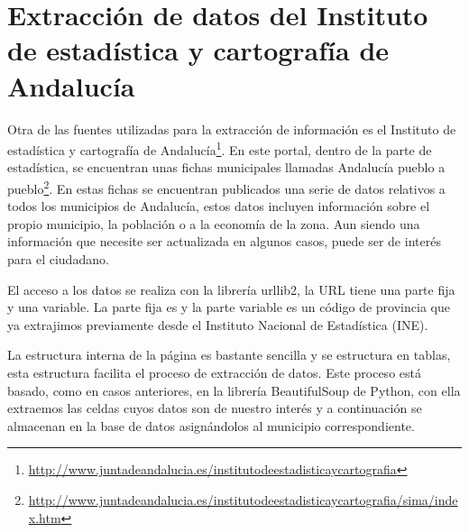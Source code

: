 \section{Extracción de datos del Instituto de estadística y cartografía  de Andalucía}

Otra de las fuentes utilizadas para la extracción de información es el Instituto de estadística y cartografía  de Andalucía\footnote{\url{http://www.juntadeandalucia.es/institutodeestadisticaycartografia}}. En este portal, dentro de la parte de estadística, se encuentran unas fichas municipales llamadas Andalucía pueblo a pueblo\footnote{\url{http://www.juntadeandalucia.es/institutodeestadisticaycartografia/sima/index.htm}}. En estas fichas se encuentran publicados una serie de datos relativos a todos los municipios de Andalucía, estos datos incluyen información sobre el propio municipio, la población o a la economía de la zona. Aun siendo una información que necesite ser actualizada en algunos casos, puede ser de interés para el ciudadano.

El acceso a los datos se realiza con la librería urllib2, la URL tiene una parte fija y una variable. La parte fija es \textit{} y la parte variable es un código de provincia que ya extrajimos previamente desde el Instituto Nacional de Estadística (INE).

La estructura interna de la página es bastante sencilla y se estructura en tablas, esta estructura facilita el proceso de extracción de datos. Este proceso está basado, como en casos anteriores, en la librería BeautifulSoup de Python, con ella extraemos las celdas cuyos datos son de nuestro interés y a continuación se almacenan en la base de datos asignándolos al municipio correspondiente.
